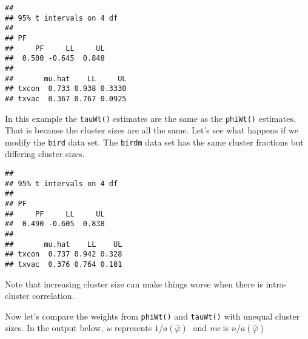 \documentclass[]{article}
\newenvironment{Shaded}{\begin{snugshade}}{\end{snugshade}}
\newcommand{\KeywordTok}[1]{\textcolor[rgb]{0.13,0.29,0.53}{\textbf{{#1}}}}
\newcommand{\DataTypeTok}[1]{\textcolor[rgb]{0.13,0.29,0.53}{{#1}}}
\newcommand{\DecValTok}[1]{\textcolor[rgb]{0.00,0.00,0.81}{{#1}}}
\newcommand{\StringTok}[1]{\textcolor[rgb]{0.31,0.60,0.02}{{#1}}}
\newcommand{\CommentTok}[1]{\textcolor[rgb]{0.56,0.35,0.01}{\textit{{#1}}}}
\newcommand{\NormalTok}[1]{{#1}}
\begin{document}
\begin{Shaded}
\end{Shaded}

\begin{verbatim}
## 
## 95% t intervals on 4 df
## 
## PF 
##     PF     LL     UL 
##  0.500 -0.645  0.848 
## 
##       mu.hat    LL     UL
## txcon  0.733 0.938 0.3330
## txvac  0.367 0.767 0.0925
\end{verbatim}

\bigskip
In this example the \texttt{tauWt()} estimates are the same as the
\texttt{phiWt()} estimates. That is because the cluster sizes are all
the same. Let's see what happens if we modify the \texttt{bird} data
set. The \texttt{birdm} data set has the same cluster fractions but
differing cluster sizes. \bigskip

\begin{Shaded}
\end{Shaded}

\begin{verbatim}
## 
## 95% t intervals on 4 df
## 
## PF 
##     PF     LL     UL 
##  0.490 -0.605  0.838 
## 
##       mu.hat    LL    UL
## txcon  0.737 0.942 0.328
## txvac  0.376 0.764 0.101
\end{verbatim}

\bigskip
Note that increasing cluster size can make things worse when there is
intra-cluster correlation.

\bigskip
Now let's compare the weights from \texttt{phiWt()} and \texttt{tauWt()}
with unequal cluster sizes. In the output below, \emph{w} represents
\(1/a(\hat{\varphi })\;\) and \emph{nw} is \(n/a(\hat{\varphi })\;\)
\bigskip
\end{document}
